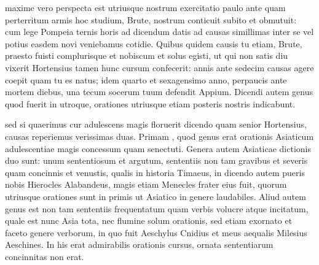  maxime vero perspecta est utriusque nostrum exercitatio paulo ante quam perterritum armis hoc studium, Brute, nostrum conticuit subito et obmutuit: cum lege Pompeia ternis horis ad dicendum datis ad causas simillimas inter se vel potius easdem novi veniebamus cotidie. Quibus quidem causis tu etiam, Brute, praesto fuisti complurisque et nobiscum et solus egisti, ut qui non satis diu vixerit Hortensius tamen hunc cursum confecerit: annis ante sedecim causas agere coepit quam tu es natus; idem quarto et sexagensimo anno, perpaucis ante mortem diebus, una tecum socerum tuum defendit Appium. Dicendi autem genus quod fuerit in utroque, orationes utriusque etiam posteris nostris indicabunt.

 sed si quaerimus cur adulescens magis floruerit dicendo quam senior Hortensius, causas reperiemus verissimas duas. Primam , quod genus erat orationis Asiaticum adulescentiae magis concessum quam senectuti. Genera autem Asiaticae dictionis duo sunt: unum sententiosum et argutum, sententiis non tam gravibus et severis quam concinnis et venustis, qualis in historia Timaeus, in dicendo autem pueris nobis Hierocles Alabandeus, magis etiam Menecles frater eius fuit, quorum utriusque orationes sunt in primis ut Asiatico in genere laudabiles. Aliud autem genus est non tam sententiis frequentatum quam verbis volucre atque incitatum, quale est nunc Asia tota, nec flumine solum orationis, sed etiam exornato et faceto genere verborum, in quo fuit Aeschylus Cnidius et meus aequalis Milesius Aeschines. In his erat admirabilis orationis cursus, ornata sententiarum concinnitas non erat.

